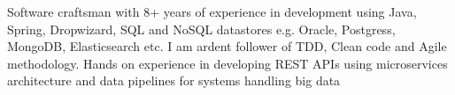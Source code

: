 

\begin{cvparagraph}

Software craftsman with 8+ years of experience in development using Java, Spring,
Dropwizard, SQL and NoSQL datastores e.g. Oracle, Postgress, MongoDB, Elasticsearch etc.
I am ardent follower of TDD, Clean code and Agile methodology. Hands on experience
in developing REST APIs using microservices architecture and data pipelines for
systems handling big data
\end{cvparagraph}
